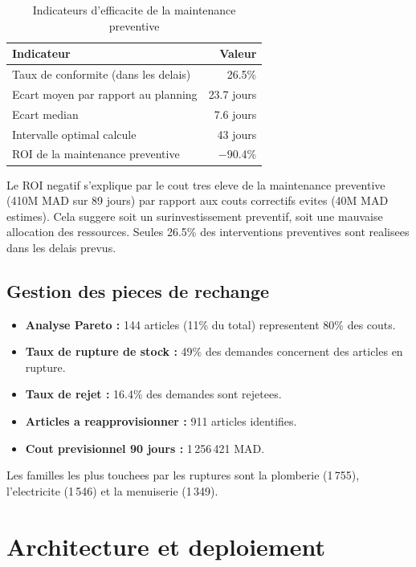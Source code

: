 \documentclass[12pt,a4paper]{article}
\begin{document}
\begin{table}[H]
\centering
\begin{tabular}{lr}
\toprule
\textbf{Indicateur} & \textbf{Valeur} \\
\midrule
Taux de conformite (dans les delais) & 26.5\% \\
Ecart moyen par rapport au planning & 23.7 jours \\
Ecart median & 7.6 jours \\
Intervalle optimal calcule & 43 jours \\
ROI de la maintenance preventive & $-$90.4\% \\
\bottomrule
\end{tabular}
\caption{Indicateurs d'efficacite de la maintenance preventive}
\end{table}

Le ROI negatif s'explique par le cout tres eleve de la maintenance preventive (410M MAD sur 89 jours) par rapport aux couts correctifs evites (40M MAD estimes). Cela suggere soit un surinvestissement preventif, soit une mauvaise allocation des ressources. Seules 26.5\% des interventions preventives sont realisees dans les delais prevus.

\subsection{Gestion des pieces de rechange}

\begin{itemize}
  \item \textbf{Analyse Pareto :} 144 articles (11\% du total) representent 80\% des couts.
  \item \textbf{Taux de rupture de stock :} 49\% des demandes concernent des articles en rupture.
  \item \textbf{Taux de rejet :} 16.4\% des demandes sont rejetees.
  \item \textbf{Articles a reapprovisionner :} 911 articles identifies.
  \item \textbf{Cout previsionnel 90 jours :} 1\,256\,421 MAD.
\end{itemize}

Les familles les plus touchees par les ruptures sont la plomberie (1\,755), l'electricite (1\,546) et la menuiserie (1\,349).

\section{Architecture et deploiement}
\end{document}

